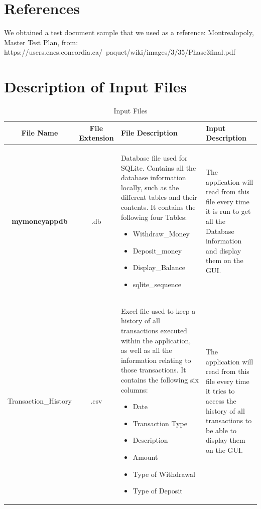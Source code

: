 \documentclass[12pt]{article}
\begin{document}
\section{References}
We obtained a test document sample that we used as a reference: Montrealopoly, Master Test Plan, from: https://users.encs.concordia.ca/~paquet/wiki/images/3/35/Phase3final.pdf

\appendix

\section{Description of Input Files}


\begin{table}[H]
\caption{Input Files}
\begin{center}
\begin{tabular}{|c|c|p{3cm}|p{2cm}}
\hline
  \bf File Name & \bf File Extension & \bf File Description & \bf Input Description \\\hline
	\bf mymoneyappdb &
		.db &
		Database file used for SQLite. Contains all the database information locally, such as the different tables and their contents. It contains the following four Tables: 
\begin{itemize} 
	\item Withdraw\_Money
	\item Deposit\_money
	\item Display\_Balance
	\item sqlite\_sequence
\end{itemize}
		& The application will read from this file every time it is run to get all the Database information and display them on the GUI. \\
		\hline
		Transaction\_History	&
		.csv 	&
		Excel file used to keep a history of all transactions executed within the application, as well as all the information relating to those transactions. It contains the following six columns:
		\begin{itemize} 
		\item Date
		\item Transaction Type
		\item Description
		\item Amount
		\item Type of Withdrawal
		\item Type of Deposit
		\end{itemize}
	& The application will read from this file every time it tries to access the history of all transactions to be able to display them on the GUI.
\end{tabular}
\end{center}
\end{table}
\end{document}
